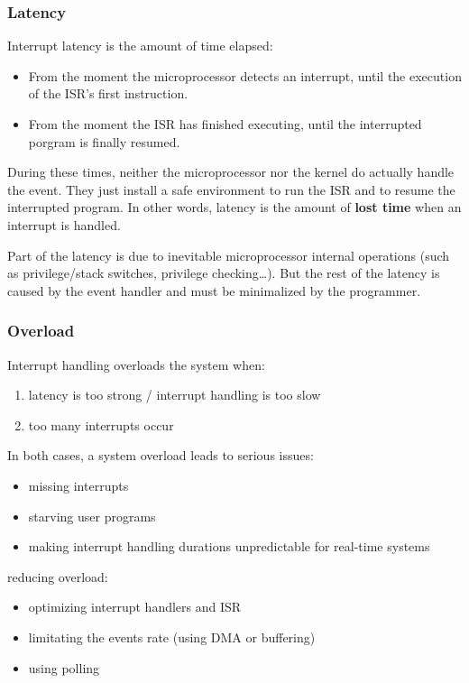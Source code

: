 %
%
%

\begin{frame}
  \frametitle{Latency}

  Interrupt latency is the amount of time elapsed:

  \begin{itemize}
  \item From the moment the microprocessor detects an interrupt, until the
    execution of the ISR's first instruction.
  \item From the moment the ISR has finished executing, until the interrupted
    porgram is finally resumed.
  \end{itemize}

  \nl

  During these times, neither the microprocessor nor the kernel do actually
  handle the event. They just install a safe environment to run the ISR and to
  resume the interrupted program. In other words, latency is the amount of
  {\bf lost time} when an interrupt is handled.

  \nl

  Part of the latency is due to inevitable microprocessor internal operations
  (such as privilege/stack switches, privilege checking\ldots). But the rest of
  the latency is caused by the event handler and must be minimalized by the
  programmer.

\end{frame}

%
%
%

\begin{frame}
  \frametitle{Overload}

  Interrupt handling overloads the system when:

  \begin{enumerate}
    \item latency is too strong / interrupt handling is too slow
    \item too many interrupts occur
  \end{enumerate}

  \nl

  In both cases, a system overload leads to serious issues:

  \begin{itemize}
    \item missing interrupts
    \item starving user programs
    \item making interrupt handling durations unpredictable for real-time systems
  \end{itemize}

  \nl

  reducing overload:
  \begin{itemize}
    \item optimizing interrupt handlers and ISR
    \item limitating the events rate (using DMA or buffering)
    \item using polling
  \end{itemize}

\end{frame}

